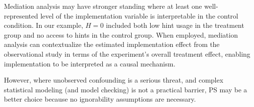 \documentclass{article}\usepackage[]{graphicx}\usepackage[]{color}
\begin{document}
Mediation analysis may have stronger standing where
at least one well-represented level of the implementation
variable is interpretable in the control condition.
In our example, $H=0$ included both low hint usage in
the treatment group and no access to hints in the control group.
When employed, mediation analysis can contextualize the estimated
implementation effect from the observational study in terms of the
experiment's overall treatment
effect, enabling implementation to be interpreted as a causal
mechanism.

However, where unobserved confounding is a serious threat, and complex
statistical modeling (and model checking) is not a practical barrier,
PS may be a better choice because no ignorability assumptions are necessary.

\end{document}

